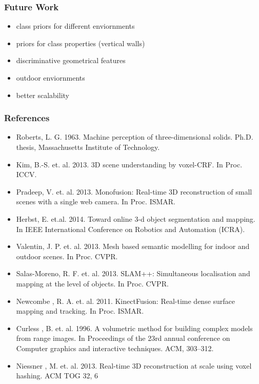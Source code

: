 \documentclass[mathserif, 10pt]{beamer}
\begin{document}
\begin{frame}
\frametitle{Future Work}
\begin{itemize}
 \item class priors for different enviornments
 \item priors for class properties (vertical walls)
 \item discriminative geometrical features
 \item outdoor enviornments
 \item better scalability
\end{itemize}


\end{frame}


\begin{frame}
\frametitle{References}
\fontsize{6pt}{7.2}\selectfont
\begin{itemize}
  \item Roberts, L. G. 1963. Machine perception of three-dimensional solids. Ph.D. thesis, Massachusetts Institute of Technology.

  \item Kim, B.-S. et. al. 2013. 3D scene understanding by voxel-CRF. In Proc. ICCV.

  \item Pradeep, V. et. al. 2013. Monofusion: Real-time 3D reconstruction of small scenes with a single web camera. In Proc. ISMAR.

  \item Herbst, E. et.al. 2014. Toward online 3-d object segmentation and mapping. In IEEE International Conference on Robotics and Automation (ICRA).

  \item Valentin, J. P. et. al. 2013. Mesh based semantic modelling for indoor and outdoor scenes. In Proc. CVPR.

  \item Salas-Moreno, R. F. et. al. 2013. SLAM++: Simultaneous localisation and mapping at the level of objects. In Proc. CVPR.

  \item Newcombe , R. A. et. al. 2011. KinectFusion: Real-time dense surface mapping and tracking. In Proc. ISMAR.  
  
  \item Curless , B. et. al. 1996. A volumetric method for building complex models from range images. In Proceedings of the 23rd annual conference on Computer graphics and interactive techniques. ACM, 303–312.
  
  \item Niessner , M. et. al. 2013. Real-time 3D reconstruction at scale using voxel hashing. ACM TOG 32, 6
\end{itemize}
\end{frame}
\end{document}
